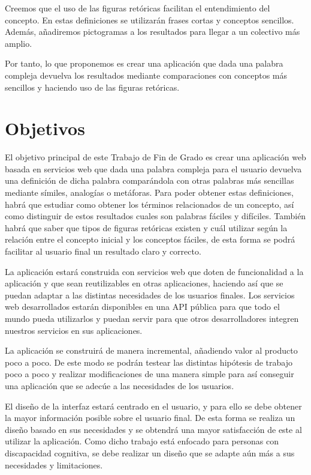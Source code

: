 Creemos que el uso de las figuras retóricas facilitan el entendimiento del concepto. En estas definiciones se utilizarán frases cortas y conceptos sencillos. 
Además, añadiremos pictogramas a los resultados para llegar a un colectivo más amplio.

Por tanto, lo que proponemos es crear una aplicación que dada una palabra compleja devuelva los resultados mediante comparaciones con conceptos más sencillos y haciendo uso de las figuras retóricas.

\section{Objetivos}
\label{cap:sec:objetivos}

El objetivo principal de este Trabajo de Fin de Grado es crear una aplicación web basada en servicios web que dada una palabra compleja para el usuario devuelva una definición de dicha palabra comparándola con otras palabras más sencillas mediante símiles, analogías o metáforas. 
Para poder obtener estas definiciones, habrá que estudiar como obtener los términos relacionados de un concepto, así como distinguir de estos resultados cuales son palabras fáciles y difíciles. 
También habrá que saber que tipos de figuras retóricas existen y cuál utilizar según la relación entre el concepto inicial y los conceptos fáciles, de esta forma se podrá facilitar al usuario final un resultado claro y correcto.

La aplicación estará construida con servicios web que doten de funcionalidad a la aplicación y que sean reutilizables en otras aplicaciones, haciendo así que se puedan adaptar a las distintas necesidades de los usuarios finales.
Los servicios web desarrollados estarán disponibles en una API pública para que todo el mundo pueda utilizarlos y puedan servir para que otros desarrolladores integren nuestros servicios en sus aplicaciones.

La aplicación se construirá de manera incremental, añadiendo valor al producto poco a poco. De este modo se podrán testear las distintas hipótesis de trabajo poco a poco y realizar modificaciones de una manera simple para así conseguir una aplicación que se adecúe a las necesidades de los usuarios.

El diseño de la interfaz estará centrado en el usuario, y para ello se debe obtener la mayor información posible sobre el usuario final. De esta forma se realiza un diseño basado en sus necesidades y se obtendrá una mayor satisfacción de este al utilizar la aplicación.
Como dicho trabajo está enfocado para personas con discapacidad cognitiva, se debe realizar un diseño que se adapte aún más a sus necesidades y limitaciones.

